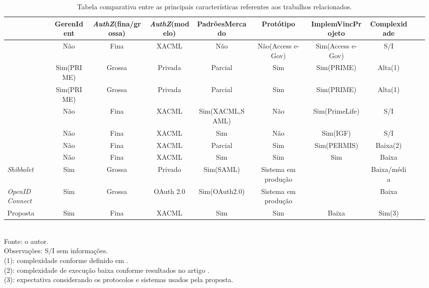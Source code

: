 \documentclass{doublecol-new}
\begin{document}
\begin{table}
	\tiny
	\centering
	\caption{Tabela comparativa entre as principais características referentes aos trabalhos relacionados.}
	\label{tab-tabela-comparativa}
	\begin{tabular}{|m{8em}|c|c|c|c|c|c|c|c|c|}
		\hline  & GerenIdent & \textit{AuthZ}(fina/grossa) & \textit{AuthZ}(modelo) & PadrõesMercado & Protótipo & ImplemVincProjeto & Complexidade \\ 
		\hline \cite{kolter2007privacy}     & Não        & Fina   & XACML           & Não            & Não(Access e-Gov) & Sim(Access e-Gov) & S/I \\ 
		\hline \cite{ardagna2008privacy}    & Sim(PRIME) & Grossa & Privada         & Parcial        & Sim               & Sim(PRIME)        & Alta(1) \\ 
		\hline \cite{ardagna2010exploiting} & Sim(PRIME) & Grossa & Privada         & Parcial        & Sim               & Sim(PRIME)        & Alta(1) \\ 
		\hline \cite{ardagna2010enabling}   & Não        & Fina   & XACML           & Sim(XACML,SAML)  & Não               & Sim(PrimeLife)    & S/I \\ 
		\hline \cite{kounga2010extending}   & Não        & Fina   & XACML           & Sim            & Não               & Sim(IGF)          & S/I \\ 
		\hline \cite{chadwick2012privacy}   & Não        & Fina   & XACML           & Parcial        & Sim               & Sim(PERMIS)       & Baixa(2) \\ 
		\hline \cite{ma2015cloud}           & Não        & Fina   & XACML           & Sim            & Sim               & Sim               & Baixa \\ 
		\hline \textit{Shibbolet}           & Sim        & Grossa & Privado         & Sim(SAML)      & Sistema em produção & \-     & Baixa/média \\
		\hline \textit{OpenID Connect}      & Sim        & Grossa & OAuth 2.0       & Sim(OAuth2.0)  & Sistema em produção & \-     & Baixa \\    
		\hline Proposta                     & Sim        & Fina   & XACML           & Sim            & Sim               & Baixa             & Sim(3) \\
		\hline 
	\end{tabular} 
	\\ Fonte: o autor.
	\\ Observações: S/I sem informações.
	\\ (1): complexidade conforme definido em \cite{nogueira2014aprimoramento}.
	\\ (2): complexidade de execução baixa conforme resultados no artigo \cite{chadwick2012privacy}.
	\\ (3): expectativa considerando os protocolos e sistemas usados pela proposta.
\end{table}
\end{document}

